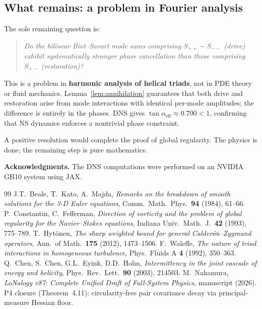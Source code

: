 \documentclass[12pt,a4paper]{article}
\theoremstyle{definition}
\begin{document}
\subsection*{What remains: a problem in Fourier analysis}

The sole remaining question is:

\begin{quote}
\emph{Do the bilinear Biot--Savart mode sums comprising
$S_{++}-S_{--}$ (drive) exhibit systematically stronger phase
cancellation than those comprising $S_{+-}$ (restoration)?}
\end{quote}

This is a problem in \textbf{harmonic analysis of helical triads},
not in PDE theory or fluid mechanics.
Lemma~\ref{lem:annihilation} guarantees that both drive and
restoration arise from mode interactions with identical per-mode
amplitudes; the difference is entirely in the phases.
DNS gives $\tan\alpha_{\mathrm{eff}}\approx 0.700<1$, confirming that
NS dynamics enforces a nontrivial phase constraint.

A positive resolution would complete the proof of global regularity.
The physics is done; the remaining step is pure mathematics.

\bigskip
\noindent\textbf{Acknowledgments.} The DNS computations were performed on an NVIDIA GB10 system using JAX.

\begin{thebibliography}{99}
 J.T.\ Beale, T.\ Kato, A.\ Majda, \emph{Remarks on the breakdown of smooth solutions for the 3-D Euler equations}, Comm.\ Math.\ Phys.\ \textbf{94} (1984), 61--66.
 P.\ Constantin, C.\ Fefferman, \emph{Direction of vorticity and the problem of global regularity for the Navier--Stokes equations}, Indiana Univ.\ Math.\ J.\ \textbf{42} (1993), 775--789.
 T.\ Hyt\"onen, \emph{The sharp weighted bound for general Calder\'on--Zygmund operators}, Ann.\ of Math.\ \textbf{175} (2012), 1473--1506.
 F.\ Waleffe, \emph{The nature of triad interactions in homogeneous turbulence}, Phys.\ Fluids A \textbf{4} (1992), 350--363.
 Q.\ Chen, S.\ Chen, G.L.\ Eyink, D.D.\ Holm, \emph{Intermittency in the joint cascade of energy and helicity}, Phys.\ Rev.\ Lett.\ \textbf{90} (2003), 214503.
 M.\ Nakamura, \emph{LoNalogy v87: Complete Unified Draft of Full-System Physics}, manuscript (2026). P4 closure (Theorem~4.11): circularity-free pair covariance decay via principal-measure Hessian floor.
\end{thebibliography}
\end{document}
